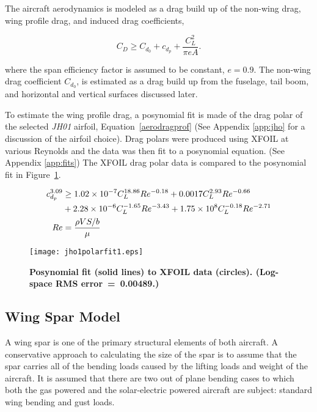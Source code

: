 The aircraft aerodynamics is modeled as a drag build up of the non-wing drag, wing profile drag, and induced drag coefficients, 

\begin{equation}
    \label{e:aerodragb}
    C_D \geq C_{d_0} + c_{d_p} + \frac{C_L^2}{\pi e A}.
    \end{equation}

where the span efficiency factor is assumed to be constant, $e=0.9$. 
The non-wing drag coefficient $C_{d_0}$, is estimated as a drag build up from the fuselage, tail boom, and horizontal and vertical surfaces discussed later.
    
To estimate the wing profile drag, a posynomial fit is made of the drag polar of the selected \emph{JH01} airfoil, Equation~\ref{aerodragprof} (See Appendix \ref{app:jho} for a discussion of the airfoil choice). 
Drag polars were produced using XFOIL\cite{xfoil} at various Reynolds and the data was then fit to a posynomial equation. (See Appendix \ref{app:fits})
    The XFOIL drag polar data is compared to the posynomial fit in Figure~\ref{f:JH01polar}.

    \begin{align}
        \label{e:aerodragprof}
        c_{d_p}^{3.09} &\geq \num{1.02d-7}C_L^{18.86}Re^{-0.18} + 0.0017C_L^{2.93}Re^{-0.66}  \nonumber \\
                       &+ \num{2.28d-6}C_L^{-1.65}Re^{-3.43}+ \num{1.75e8}C_L^{-0.18}Re^{-2.71} \\
        Re &= \frac{\rho V S/b}{\mu}
    \end{align}

\begin{figure}[h!]
	\begin{center}
	\texttt{[image: jho1polarfit1.eps]}
    \caption{\textbf{Posynomial fit (solid lines) to XFOIL data (circles).  (Log-space RMS error~=~0.00489.)}}
	\label{f:JH01polar}
	\end{center}
\end{figure}


\subsection{Wing Spar Model}

A wing spar is one of the primary structural elements of both aircraft. 
A conservative approach to calculating the size of the spar is to assume that the spar carries all of the bending loads caused by the lifting loads and weight of the aircraft.  
It is assumed that there are two out of plane bending cases to which both the gas powered and the solar-electric powered aircraft are subject: standard wing bending and gust loads. 

